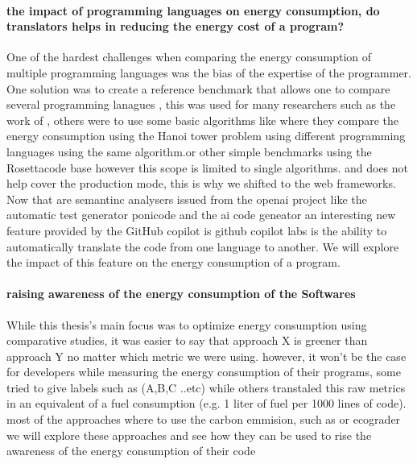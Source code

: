 \paragraph{the impact of programming languages on energy consumption, do translators helps in reducing the energy cost of a program?}
One of the hardest challenges when comparing the energy consumption of multiple programming languages was the bias of the expertise of the programmer. One solution was to create a reference benchmark that allows one to compare several programming lanagues , this was used for many researchers such as the work of \citeauthor{couto2017towards} \cite{couto2017towards}, others were to use some basic algorithms like \cite{noureddine_preliminary_2012} where they compare the energy consumption using the Hanoi tower problem  using different programming languages using the same algorithm.or other simple benchmarks using the Rosettacode base 
however this scope is limited to single algorithms. and does not help cover the production mode, this is why we shifted to the web frameworks.  Now that are semantinc analysers issued from the openai project like the automatic test generator ponicode and the ai code geneator 
an interesting new feature provided by the GitHub copilot is github copilot labs is the ability to automatically translate the code from one language to another. We will explore the impact of this feature on the energy consumption of a program.


\paragraph{raising awareness of the energy consumption of the Softwares}
While this thesis's main focus was to optimize energy consumption using comparative studies, it was easier to say that approach X is greener than approach Y no matter which metric we were using. however, it won't be the case for developers while measuring the energy consumption of their programs, some tried to give labels such as (A,B,C ..etc) while others transtaled this raw metrics in an equivalent of a fuel consumption (e.g. 1 liter of fuel per 1000 lines of code). most of the approaches where to use the carbon emmision, such as\cite{patterson2021carbon} or ecograder~
we will explore these approaches and see how they can be used to rise the awareness of the energy consumption of their code






